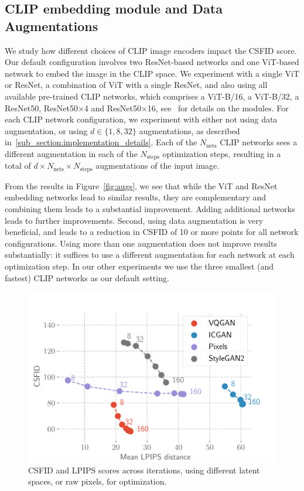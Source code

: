 \subsection{CLIP embedding module and Data Augmentations} 
We study how different choices of \ac{CLIP} image encoders impact the \ac{CSFID} score. 
Our default configuration involves two ResNet-based networks and one ViT-based network 
to embed the image in the \ac{CLIP} space. 
We experiment with a single ViT or ResNet, a combination of ViT with a single  ResNet,  
and also using all available pre-trained \ac{CLIP} networks, which comprises a ViT-B/16, a
 ViT-B/32, a ResNet50, ResNet50$\times$4 and ResNet50$\times$16,
  see~\citep{radford2021learning} for details on the modules.
For each \ac{CLIP} network configuration, we experiment with  either  not using data 
augmentation, or using $d \in\{ 1, 8, 32\}$ augmentations, as described in~\ref{sub_section:implementation_details}.
Each of the $N_\textrm{nets}$ \ac{CLIP} networks sees a different augmentation in each of 
the $N_\textrm{steps}$ optimization steps,  resulting in a total of
 $d \times N_\textrm{nets} \times N_\textrm{steps}$ augmentations of the input image.

From the results in Figure~\ref{fig:augs}, we see that while the  ViT and  ResNet 
embedding networks lead to similar results, they are complementary and combining them 
leads to a substantial improvement.  
Adding additional networks leads to further improvements.
%
Second, using data augmentation is very beneficial, and leads to a reduction in \ac{CSFID} 
of 10 or more points for all network configurations. 
Using more than one augmentation does not improve results substantially: it suffices 
to use a different augmentation for each network at each optimization step.
In our other experiments we use the three smallest (and fastest) \ac{CLIP} networks as our 
default setting.


\begin{figure}[h!]
    \centering
    \includegraphics[width=.9\linewidth]{images/flexit/assets/encoder_evol.pdf}
    \caption{\ac{CSFID} and \ac{LPIPS} scores across iterations, using different latent spaces, or raw pixels, for optimization. 
    }
    \label{fig:encoders}
\end{figure}



